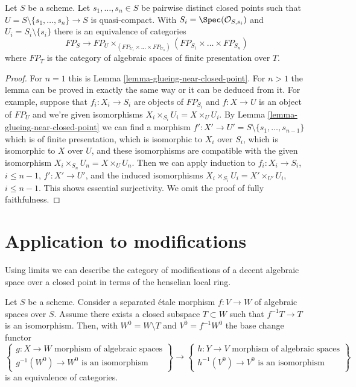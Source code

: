 \begin{lemma}
\label{lemma-glueing-near-multiple-closed-points}
Let $S$ be a scheme. Let $s_1, \ldots, s_n \in S$ be
pairwise distinct closed points such that
$U = S \setminus \{s_1, \ldots, s_n\} \to S$ is quasi-compact. With
$S_i = \Spec(\mathcal{O}_{S, s_i})$ and $U_i = S_i \setminus \{s_i\}$
there is an equivalence of categories
$$
FP_S \longrightarrow
FP_U \times_{(FP_{U_1} \times \ldots \times FP_{U_n})}
(FP_{S_1} \times \ldots \times FP_{S_n})
$$
where $FP_T$ is the category of algebraic spaces of finite presentation
over $T$.
\end{lemma}

\begin{proof}
For $n = 1$ this is Lemma \ref{lemma-glueing-near-closed-point}.
For $n > 1$ the lemma can be proved in exactly the same way or it
can be deduced from it. For example, suppose that $f_i : X_i \to S_i$
are objects of $FP_{S_i}$ and $f : X \to U$ is an object
of $FP_U$ and we're given isomorphisms $X_i \times_{S_i} U_i = X \times_U U_i$.
By Lemma \ref{lemma-glueing-near-closed-point} we can find
a morphism $f' : X' \to U' = S \setminus \{s_1, \ldots, s_{n - 1}\}$
which is of finite presentation, which is isomorphic to
$X_i$ over $S_i$, which is isomorphic to $X$ over $U$, and
these isomorphisms are compatible with the given isomorphism
$X_i \times_{S_n} U_n = X \times_U U_n$.
Then we can apply induction to
$f_i : X_i \to S_i$, $i \leq n - 1$,
$f' : X' \to U'$, and the induced
isomorphisms $X_i \times_{S_i} U_i = X' \times_{U'} U_i$, $i \leq n - 1$.
This shows essential surjectivity. We omit the proof of
fully faithfulness.
\end{proof}







\section{Application to modifications}
\label{section-modifications-at-a-point}

\noindent
Using limits we can describe the category of modifications of
a decent algebraic space over a closed point in terms of the
henselian local ring.

\begin{lemma}
\label{lemma-excision-modifications}
Let $S$ be a scheme. Consider a separated \'etale morphism
$f : V \to W$ of algebraic spaces over $S$.
Assume there exists a
closed subspace $T \subset W$ such that $f^{-1}T \to T$ is
an isomorphism. Then, with $W^0 = W \setminus T$ and
$V^0 = f^{-1}W^0$ the base change functor
$$
\left\{
\begin{matrix}
g : X \to W\text{ morphism of algebraic spaces} \\
g^{-1}(W^0) \to W^0\text{ is an isomorphism}
\end{matrix}
\right\}
\longrightarrow
\left\{
\begin{matrix}
h : Y \to V\text{ morphism of algebraic spaces} \\
h^{-1}(V^0) \to V^0\text{ is an isomorphism}
\end{matrix}
\right\}
$$
is an equivalence of categories.
\end{lemma}

